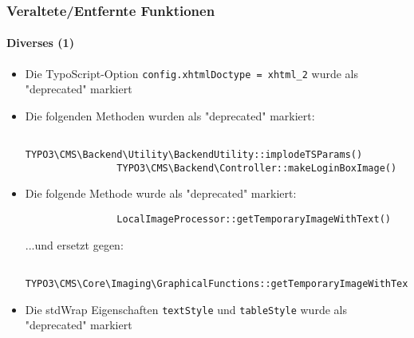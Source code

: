 \begin{frame}[fragile]
	\frametitle{Veraltete/Entfernte Funktionen}
	\framesubtitle{Diverses (1)}

	\begin{itemize}
		\item Die TypoScript-Option \texttt{config.xhtmlDoctype = xhtml\_2}\newline
			wurde als "deprecated" markiert

		\item Die folgenden Methoden wurden als "deprecated" markiert:
			\begin{lstlisting}
				TYPO3\CMS\Backend\Utility\BackendUtility::implodeTSParams()
				TYPO3\CMS\Backend\Controller::makeLoginBoxImage()
			\end{lstlisting}

		\item Die folgende Methode wurde als "deprecated" markiert:
			\begin{lstlisting}
				LocalImageProcessor::getTemporaryImageWithText()
			\end{lstlisting}

			...und ersetzt gegen:

			\begin{lstlisting}
				TYPO3\CMS\Core\Imaging\GraphicalFunctions::getTemporaryImageWithText()
			\end{lstlisting}

		\item Die stdWrap Eigenschaften \texttt{textStyle} und \texttt{tableStyle}\newline
			wurde als "deprecated" markiert

	\end{itemize}

\end{frame}


